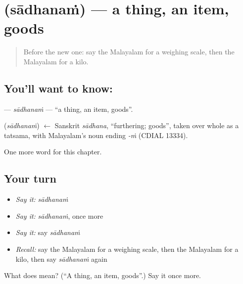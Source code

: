 \section[\texorpdfstring{\ml{സാധനം} (sādhanaṁ)}{സാധനം (sādhanaṁ)}]{ (sādhanaṁ) — a thing, an item, goods}

\label{lesson:ML-C260-sadhanam}



\begin{quote}
Before the new one: say the Malayalam for a weighing scale, then the Malayalam for a kilo.
\end{quote}

\subsection*{You'll want to know: }
\textbf{} — \emph{sādhanaṁ} — \textquotedblleft{}a thing, an item, goods\textquotedblright{}.

\begin{cousinweb}
\textbf{} (\emph{sādhanaṁ}) $\leftarrow$ Sanskrit \emph{sādhana}, \textquotedblleft{}furthering; goods\textquotedblright{}, taken over whole as a tatsama, with Malayalam's noun ending \emph{-ṁ} (CDIAL 13334).
\end{cousinweb}

\begin{grammarlens}[title={What you've built}]
One more word for this chapter.
\end{grammarlens}

\subsection*{Your turn}
\begin{itemize}
\raggedright
  \item \emph{Say it:} \emph{sādhanaṁ}
  \item \emph{Say it:} \emph{sādhanaṁ}, once more
  \item \emph{Say it:} say \emph{sādhanaṁ}
  \item \emph{Recall:} say the Malayalam for a weighing scale, then the Malayalam for a kilo, then say \emph{sādhanaṁ} again
\end{itemize}

\begin{tcolorbox}[breakable,colback=teal!4,colframe=teal!35!black,title={Before you move on}]
What does  mean? (\textquotedblleft{}A thing, an item, goods\textquotedblright{}.) Say it once more.
\end{tcolorbox}
